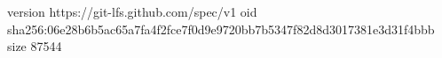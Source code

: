 version https://git-lfs.github.com/spec/v1
oid sha256:06e28b6b5ac65a7fa4f2fce7f0d9e9720bb7b5347f82d8d3017381e3d31f4bbb
size 87544
